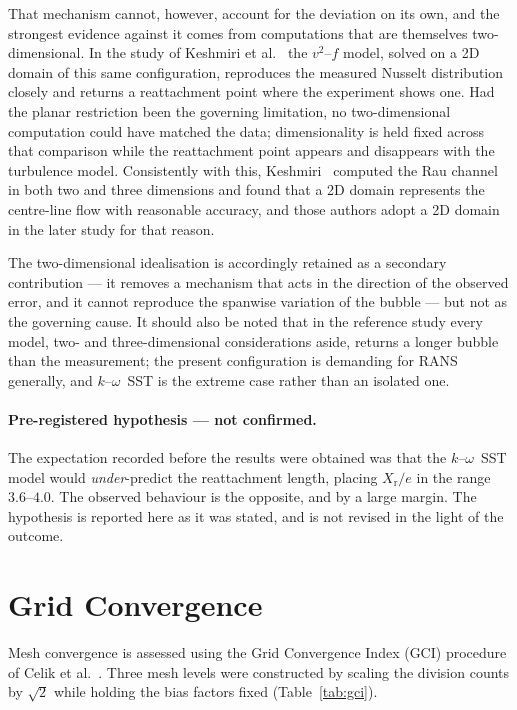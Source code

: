 \documentclass[11pt,a4paper]{article}
\newcommand{\Xr}{X_{\mathrm{r}}}
\begin{document}
That mechanism cannot, however, account for the deviation on its own, and
the strongest evidence against it comes from computations that are
themselves two-dimensional. In the study of Keshmiri et
al.~\cite{keshmiri2016} the $v^{2}$--$f$ model, solved on a 2D domain of
this same configuration, reproduces the measured Nusselt distribution
closely and returns a reattachment point where the experiment shows one. Had
the planar restriction been the governing limitation, no two-dimensional
computation could have matched the data; dimensionality is held fixed across
that comparison while the reattachment point appears and disappears with the
turbulence model. Consistently with this, Keshmiri~\cite{keshmiri2012}
computed the Rau channel in both two and three dimensions and found that a
2D domain represents the centre-line flow with reasonable accuracy, and
those authors adopt a 2D domain in the later study for that reason.

The two-dimensional idealisation is accordingly retained as a secondary
contribution --- it removes a mechanism that acts in the direction of the
observed error, and it cannot reproduce the spanwise variation of the
bubble --- but not as the governing cause. It should also be noted that in
the reference study every model, two- and three-dimensional considerations
aside, returns a longer bubble than the measurement; the present
configuration is demanding for RANS generally, and $k$--$\omega$~SST is the
extreme case rather than an isolated one.

\paragraph{Pre-registered hypothesis --- not confirmed.}
The expectation recorded before the results were obtained was that the
$k$--$\omega$~SST model would \emph{under}-predict the reattachment length,
placing $\Xr/e$ in the range $3.6$--$4.0$. The observed behaviour is the
opposite, and by a large margin. The hypothesis is reported here as it was
stated, and is not revised in the light of the outcome.

\section{Grid Convergence}
\label{sec:gci}

Mesh convergence is assessed using the Grid Convergence Index (GCI)
procedure of Celik et al.~\cite{celik2008}. Three mesh levels were
constructed by scaling the division counts by $\sqrt{2}$ while holding the
bias factors fixed (Table~\ref{tab:gci}).
\end{document}
